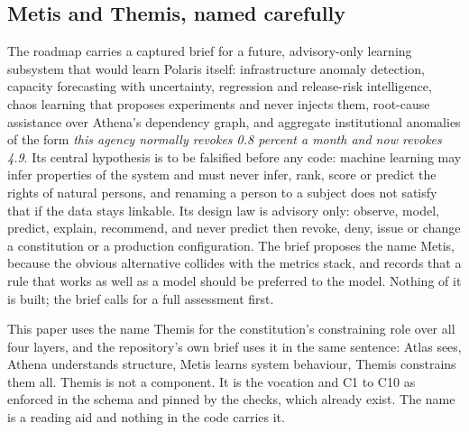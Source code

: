 \subsection{Metis and Themis, named carefully}

The roadmap carries a captured brief for a future, advisory-only learning subsystem that would learn
Polaris itself: infrastructure anomaly detection, capacity forecasting with uncertainty, regression
and release-risk intelligence, chaos learning that proposes experiments and never injects them,
root-cause assistance over Athena's dependency graph, and aggregate institutional anomalies of the
form \emph{this agency normally revokes 0.8 percent a month and now revokes 4.9}. Its central
hypothesis is to be falsified before any code: machine learning may infer properties of the system
and must never infer, rank, score or predict the rights of natural persons, and renaming a person
to a subject does not satisfy that if the data stays linkable. Its design law is advisory only:
observe, model, predict, explain, recommend, and never predict then revoke, deny, issue or change a
constitution or a production configuration. The brief proposes the name Metis, because the obvious
alternative collides with the metrics stack, and records that a rule that works as well as a model
should be preferred to the model. Nothing of it is built; the brief calls for a full assessment
first. \sFut

This paper uses the name Themis for the constitution's constraining role over all four layers, and
the repository's own brief uses it in the same sentence: Atlas sees, Athena understands structure,
Metis learns system behaviour, Themis constrains them all. Themis is not a component. It is the
vocation and C1 to C10 as enforced in the schema and pinned by the checks, which already exist. The
name is a reading aid and nothing in the code carries it.

